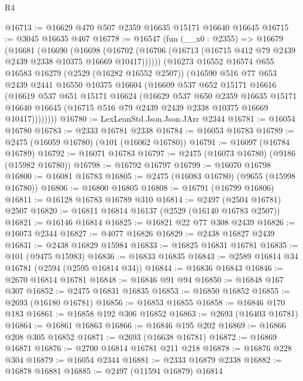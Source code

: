 \begin{lexlean}{R4}
\begin{coremodule}
@16713 := @16629 @470 @507 @2359 @16635 @15171 @16640 @16645
@16715 := @3045 @16635 @467
@16778 := @16547
    (fun (__x0 : @2355) =>
    @16679
      (@16681
        (@16690
          (@16698
            (@16702 (@16706 (@16713 (@16715 @412 @79 @2439 @2439 @2338 @10375 @16669 @10417))))))
        (@16273
          @16552
          @16574
          @655
          @16583
          @16279
          (@2529 (@16282 @16552 @2507))
          (@16590
            @516
            @77
            @653
            @2439
            @2441
            @16550
            @10375
            @16604
            (@16609
              @537
              @652
              @15171
              @16616
              (@16619
                @537
                @651
                @15171
                @16624
                (@16629
                  @537
                  @650
                  @2359
                  @16635
                  @15171
                  @16640
                  @16645
                  (@16715 @516 @79 @2439 @2439 @2338 @10375 @16669 @10417))))))))
@16780 := LexLeanStd.Json.Json.JArr @2344
@16781 := @16054 @16780
@16783 := @2333 @16781 @2338
@16784 := @16053 @16783
@16789 := @2475 (@16059 @16780) (@101 (@16062 @16780))
@16791 := @16097 (@16784 @16789)
@16792 := @16071 @16783
@16797 := @2475 (@16073 @16780) (@9186 (@15982 @16780))
@16798 := @16792 @16797
@16799 := @16070 @16798
@16800 := @16081 @16783
@16805 := @2475 (@16083 @16780) (@9655 (@15998 @16780))
@16806 := @16800 @16805
@16808 := @16791 (@16799 @16806)
@16811 := @16128 @16783 @16789 @310
@16814 := @2497 (@2504 @16781) @2507
@16820 := @16811 @16814 @16137 (@2529 (@16140 @16783 @2507))
@16821 := @16146 @16814
@16825 := @16821 @22 @77 @308 @2439
@16826 := @16073 @2344
@16827 := @4077 @16826
@16829 := @2438 @16827 @2439
@16831 := @2438 @16829 @15984
@16833 := @16825 @16831 @16781
@16835 := @101 (@9475 @15983)
@16836 := @16833 @16835
@16843 := @2589 @16814 @34 @16781 (@2594 (@2595 @16814 @34))
@16844 := @16836 @16843
@16846 := @2670 @16814 @16781
@16848 := @16846 @91 @94
@16850 := @16848 @167 @307
@16852 := @2475 @16831 @16835
@16853 := @16850 @16852
@16855 := @2693 (@16180 @16781)
@16856 := @16853 @16855
@16858 := @16846 @170 @183
@16861 := @16858 @192 @306 @16852
@16863 := @2693 (@16403 @16781)
@16864 := @16861 @16863
@16866 := @16846 @195 @202
@16869 := @16866 @208 @305 @16852
@16871 := @2693 (@16638 @16781)
@16872 := @16869 @16871
@16876 := @2700 @16814 @16781 @211 @218
@16878 := @16876 @228 @304
@16879 := @16054 @2344
@16881 := @2333 @16879 @2338
@16882 := @16878 @16881
@16885 := @2497 (@11594 @16879) @16814

\end{coremodule}
\end{lexlean}
